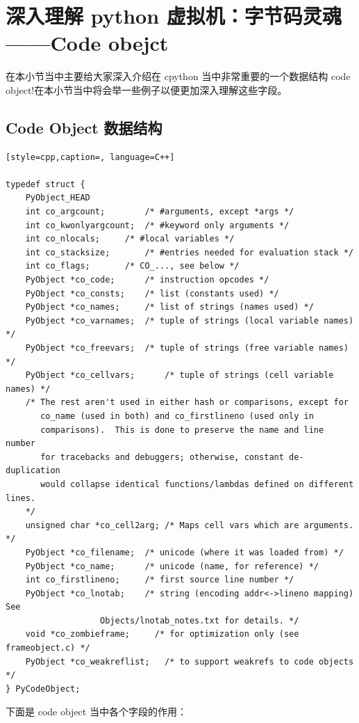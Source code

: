 \section{深入理解 python 虚拟机：字节码灵魂——Code obejct}
在本小节当中主要给大家深入介绍在 cpython 当中非常重要的一个数据结构 code object!在本小节当中将会举一些例子以便更加深入理解这些字段。
\subsection{Code Object 数据结构}
\begin{lstlisting}[style=cpp,caption=, language=C++]

typedef struct {
    PyObject_HEAD
    int co_argcount;		/* #arguments, except *args */
    int co_kwonlyargcount;	/* #keyword only arguments */
    int co_nlocals;		/* #local variables */
    int co_stacksize;		/* #entries needed for evaluation stack */
    int co_flags;		/* CO_..., see below */
    PyObject *co_code;		/* instruction opcodes */
    PyObject *co_consts;	/* list (constants used) */
    PyObject *co_names;		/* list of strings (names used) */
    PyObject *co_varnames;	/* tuple of strings (local variable names) */
    PyObject *co_freevars;	/* tuple of strings (free variable names) */
    PyObject *co_cellvars;      /* tuple of strings (cell variable names) */
    /* The rest aren't used in either hash or comparisons, except for
       co_name (used in both) and co_firstlineno (used only in
       comparisons).  This is done to preserve the name and line number
       for tracebacks and debuggers; otherwise, constant de-duplication
       would collapse identical functions/lambdas defined on different lines.
    */
    unsigned char *co_cell2arg; /* Maps cell vars which are arguments. */
    PyObject *co_filename;	/* unicode (where it was loaded from) */
    PyObject *co_name;		/* unicode (name, for reference) */
    int co_firstlineno;		/* first source line number */
    PyObject *co_lnotab;	/* string (encoding addr<->lineno mapping) See
				   Objects/lnotab_notes.txt for details. */
    void *co_zombieframe;     /* for optimization only (see frameobject.c) */
    PyObject *co_weakreflist;   /* to support weakrefs to code objects */
} PyCodeObject;
\end{lstlisting}
下面是 code object 当中各个字段的作用：
